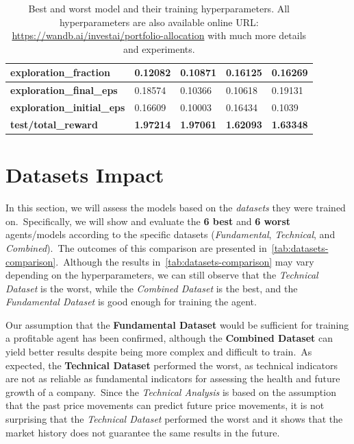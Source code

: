 \documentclass[../xlapes02]{subfiles}
\begin{document}
\begin{table}[H]
{\begin{tabular}{|l||l|l||l|l|}
                \textbf{exploration\_fraction}     & 0.12082                                      & 0.10871                                      & 0.16125                                      & 0.16269                                      \\ \hline
                \textbf{exploration\_final\_eps}   & 0.18574                                      & 0.10366                                      & 0.10618                                      & 0.19131                                      \\ \hline
                \textbf{exploration\_initial\_eps} & 0.16609                                      & 0.10003                                      & 0.16434                                      & 0.1039                                       \\ \hline
                \textbf{test/total\_reward}        & \textcolor[RGB]{50,150,50}{\textbf{1.97214}} & \textcolor[RGB]{50,150,50}{\textbf{1.97061}} & \textcolor[RGB]{150,50,50}{\textbf{1.62093}} & \textcolor[RGB]{150,50,50}{\textbf{1.63348}} \\ \hline
            \end{tabular}
        }
        \caption{Best and worst model and their training hyperparameters. All hyperparameters are also available online URL: \url{https://wandb.ai/investai/portfolio-allocation} with much more details and experiments.}
        \label{tab:best-worst-hyperparameters}
    \end{table}


    \section{Datasets Impact}\label{sec:datasets-impact}
    In this section, we will assess the models based on the \emph{datasets} they were trained on.\ Specifically, we will show and evaluate the \textbf{6 best} and \textbf{6 worst} agents/models according to the specific datasets (\emph{Fundamental}, \emph{Technical}, and \emph{Combined}).\ The outcomes of this comparison are presented in~\cref{tab:datasets-comparison}.\ Although the results in~\cref{tab:datasets-comparison} may vary depending on the hyperparameters, we can still observe that the \emph{Technical Dataset} is the worst, while the \emph{Combined Dataset} is the best, and the \emph{Fundamental Dataset} is good enough for training the agent.

    Our assumption that the \textbf{Fundamental Dataset} would be sufficient for training a profitable agent has been confirmed, although the \textbf{Combined Dataset} can yield better results despite being more complex and difficult to train.\ As expected, the \textbf{Technical Dataset} performed the worst, as technical indicators are not as reliable as fundamental indicators for assessing the health and future growth of a company.\ Since the \emph{Technical Analysis} is based on the assumption that the past price movements can predict future price movements, it is not surprising that the \emph{Technical Dataset} performed the worst and it shows that the market history does not guarantee the same results in the future.
\end{document}
